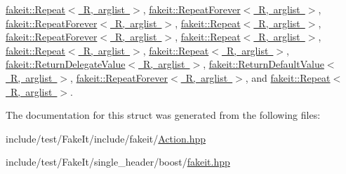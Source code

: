 \mbox{\hyperlink{structfakeit_1_1Repeat_a4822600fad5bce408fcd03d71ff333eb}{fakeit\+::\+Repeat$<$ R, arglist $>$}}, \mbox{\hyperlink{structfakeit_1_1RepeatForever_af5922669a521e99ca18218972b86cb87}{fakeit\+::\+Repeat\+Forever$<$ R, arglist $>$}}, \mbox{\hyperlink{structfakeit_1_1RepeatForever_af5922669a521e99ca18218972b86cb87}{fakeit\+::\+Repeat\+Forever$<$ R, arglist $>$}}, \mbox{\hyperlink{structfakeit_1_1Repeat_a4822600fad5bce408fcd03d71ff333eb}{fakeit\+::\+Repeat$<$ R, arglist $>$}}, \mbox{\hyperlink{structfakeit_1_1RepeatForever_af5922669a521e99ca18218972b86cb87}{fakeit\+::\+Repeat\+Forever$<$ R, arglist $>$}}, \mbox{\hyperlink{structfakeit_1_1Repeat_a4822600fad5bce408fcd03d71ff333eb}{fakeit\+::\+Repeat$<$ R, arglist $>$}}, \mbox{\hyperlink{structfakeit_1_1Repeat_a4822600fad5bce408fcd03d71ff333eb}{fakeit\+::\+Repeat$<$ R, arglist $>$}}, \mbox{\hyperlink{structfakeit_1_1Repeat_a4822600fad5bce408fcd03d71ff333eb}{fakeit\+::\+Repeat$<$ R, arglist $>$}}, \mbox{\hyperlink{structfakeit_1_1ReturnDelegateValue_ac6c33b7d5fff3fedeec91a4780924b84}{fakeit\+::\+Return\+Delegate\+Value$<$ R, arglist $>$}}, \mbox{\hyperlink{structfakeit_1_1ReturnDefaultValue_a7fbbfec578ab1944c73379d63185e06e}{fakeit\+::\+Return\+Default\+Value$<$ R, arglist $>$}}, \mbox{\hyperlink{structfakeit_1_1RepeatForever_af5922669a521e99ca18218972b86cb87}{fakeit\+::\+Repeat\+Forever$<$ R, arglist $>$}}, and \mbox{\hyperlink{structfakeit_1_1Repeat_a4822600fad5bce408fcd03d71ff333eb}{fakeit\+::\+Repeat$<$ R, arglist $>$}}.



The documentation for this struct was generated from the following files\+:\begin{DoxyCompactItemize}
\item 
include/test/\+Fake\+It/include/fakeit/\mbox{\hyperlink{Action_8hpp}{Action.\+hpp}}\item 
include/test/\+Fake\+It/single\+\_\+header/boost/\mbox{\hyperlink{single__header_2boost_2fakeit_8hpp}{fakeit.\+hpp}}\end{DoxyCompactItemize}
